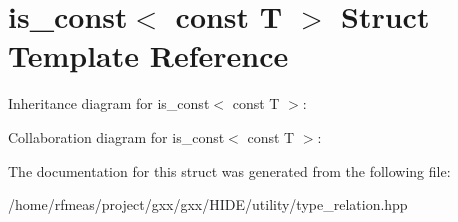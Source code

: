 \hypertarget{structis__const_3_01const_01T_01_4}{}\section{is\+\_\+const$<$ const T $>$ Struct Template Reference}
\label{structis__const_3_01const_01T_01_4}


Inheritance diagram for is\+\_\+const$<$ const T $>$\+:


Collaboration diagram for is\+\_\+const$<$ const T $>$\+:


The documentation for this struct was generated from the following file\+:\begin{DoxyCompactItemize}
\item 
/home/rfmeas/project/gxx/gxx/\+H\+I\+D\+E/utility/type\+\_\+relation.\+hpp\end{DoxyCompactItemize}
